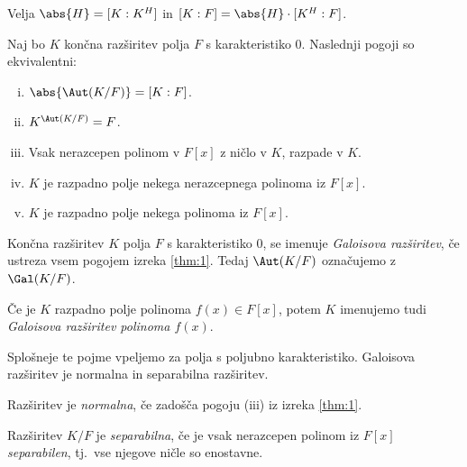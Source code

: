 %    

\begin{lema}
    Velja $\abs{H} = [K : K^H]$ in $[K : F] = \abs{H} \cdot [K^H : F]$.
\end{lema}

%    

\begin{izrek}
    Naj bo $K$ končna razširitev polja $F$ s karakteristiko $0$. Naslednji pogoji 
    so ekvivalentni:
    \begin{enumerate}[(i)]
        \item $\abs{\Aut(K/F)} = [K:F]$.
        \item $K^{\Aut(K/F)} = F$.
        \item Vsak nerazcepen polinom v $F[x]$ z ničlo v $K$, razpade v $K$.
        \item $K$ je razpadno polje nekega nerazcepnega polinoma iz $F[x]$.
        \item $K$ je razpadno polje nekega polinoma iz $F[x]$.
    \end{enumerate}
    \label{thm:1}
\end{izrek}

%    

\begin{definicija}
    Končna razširitev $K$ polja $F$ s karakteristiko $0$, se imenuje 
    \emph{Galoisova razširitev}, 
    če ustreza vsem pogojem izreka \ref{thm:1}.
    Tedaj $\Aut(K/F)$ označujemo z $\Gal(K/F)$.

    Če je $K$ razpadno polje polinoma $f(x) \in F[x]$, potem $K$ imenujemo tudi 
    \emph{Galoisova razširitev polinoma $f(x)$}. 
\end{definicija}

\begin{opomba}
    Splošneje te pojme vpeljemo za polja s poljubno karakteristiko. Galoisova
    razširitev je normalna in separabilna razširitev.

    Razširitev je \emph{normalna}, če zadošča 
    pogoju (iii) iz izreka \ref{thm:1}.

    Razširitev $K/F$ je \emph{separabilna}, 
    če je vsak nerazcepen polinom iz $F[x]$ \emph{separabilen}, 
    tj.~vse njegove ničle so enostavne.
\end{opomba}

